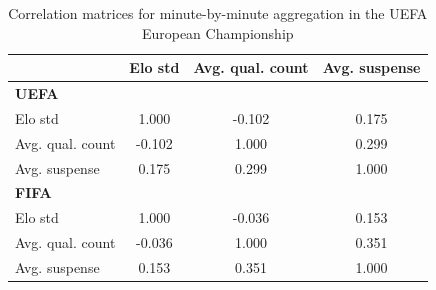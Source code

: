 \begin{table}[H]
\centering
\small
\caption{Correlation matrices for minute-by-minute aggregation in the UEFA European Championship}
\label{tab:corr_eu_mbm}
\begin{tabular}{lccc}
\toprule
 & Elo std & Avg. qual. count & Avg. suspense \\
\midrule
\multicolumn{4}{l}{\textbf{UEFA}} \\
Elo std             & 1.000 & -0.102 & 0.175 \\
Avg. qual. count    & -0.102 & 1.000 & 0.299 \\
Avg. suspense       & 0.175 & 0.299 & 1.000 \\
\midrule
\multicolumn{4}{l}{\textbf{FIFA}} \\
Elo std             & 1.000 & -0.036 & 0.153 \\
Avg. qual. count    & -0.036 & 1.000 & 0.351 \\
Avg. suspense       & 0.153 & 0.351 & 1.000 \\
\bottomrule
\end{tabular}
\end{table}
